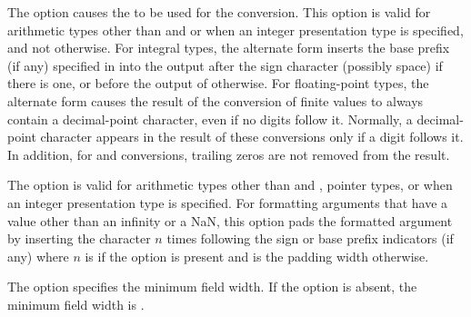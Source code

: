\documentclass{wg21}
\begin{document}
\pnum
The \tcode{\#} option causes the
to be used for the conversion.
This option is valid for arithmetic types other than
  and 
or when an integer presentation type is specified, and not otherwise.
For integral types,
the alternate form inserts the
base prefix (if any) specified in 
into the output after the sign character (possibly space) if there is one, or
before the output of  otherwise.
For floating-point types,
the alternate form causes the result of the conversion of finite values
to always contain a decimal-point character,
even if no digits follow it.
Normally, a decimal-point character appears in the result of these
conversions only if a digit follows it.
In addition, for  and  conversions,
trailing zeros are not removed from the result.

\pnum
The  option is valid for arithmetic types
other than   and , pointer types, or
when an integer presentation type is specified.
For formatting arguments that have a value
other than an infinity or a NaN,
this option pads the formatted argument by
inserting the  character $n$ times
following the sign or base prefix indicators (if any)
where $n$ is  if the  option is present and
is the padding width otherwise.
\begin{example}
\end{example}

\pnum
The  option specifies the minimum field width.
If the  option is absent,
the minimum field width is .
\end{document}

